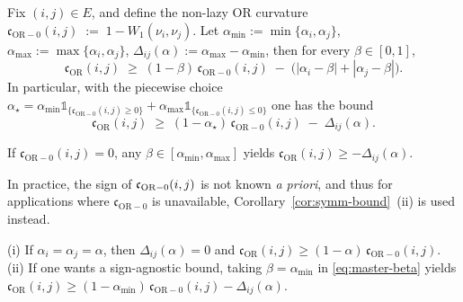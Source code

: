 \documentclass[twoside,11pt]{article}
\numberwithin{equation}{section}
\numberwithin{theorem}{section}
\numberwithin{example}{section}
\begin{document}
\begin{proposition}
\label{prop:sharper-transfer}
Fix $(i,j)\in E$, and define the non-lazy OR curvature
\(
\mathfrak c_{\mathrm{OR}-0}(i,j) \;:=\; 1 - W_1(\nu_i,\nu_j).
\)
Let $\alpha_{\min}:=\min\{\alpha_i,\alpha_j\}$, $\alpha_{\max}:=\max\{\alpha_i,\alpha_j\}$, $\Delta_{ij}(\alpha):=\alpha_{\max}-\alpha_{\min}$, then for every $\beta\in[0,1]$,
\begin{equation}
\label{eq:master-beta}
\mathfrak c_{\mathrm{OR}}(i,j)
\;\ge\;
(1-\beta)\,\mathfrak c_{\mathrm{OR}-0}(i,j)\;-\;\bigl(|\alpha_i-\beta|+|\alpha_j-\beta|\bigr).
\end{equation}
In particular, with the piecewise choice
\(\alpha_\star =\alpha_{\min}\mathds 1_{\{\mathfrak c_{\mathrm{OR}\!-\!0}(i,j)\ge 0\}}+\alpha_{\max}\mathds 1_{\{\mathfrak c_{\mathrm{OR}\!-\!0}(i,j)\le 0\}}
\)
one has the bound
\begin{equation}
\label{eq:sharper-piecewise}
\mathfrak c_{\mathrm{OR}}(i,j)
\;\ge\;
(1-\alpha_\star)\,\mathfrak c_{\mathrm{OR}-0}(i,j)\;-\;\Delta_{ij}(\alpha).
\end{equation}
\end{proposition}

\begin{remark}
If $\mathfrak c_{\mathrm{OR}-0}(i,j)=0$, any $\beta\in[\alpha_{\min},\alpha_{\max}]$ yields $\mathfrak c_{\mathrm{OR}}(i,j)\ge-\Delta_{ij}(\alpha)$.
\end{remark}

In practice, the sign of $\mathfrak c_{\rm OR-0}(i,j)$ is not known \emph{a priori}, and thus for applications where $\mathfrak c_{\mathrm{OR}-0}$ is unavailable, Corollary~\ref{cor:symm-bound}~{\rm(ii)} is used instead. 

\begin{corollary}
\label{cor:symm-bound} 
{\rm (i)} If $\alpha_i=\alpha_j=\alpha$, then $\Delta_{ij}(\alpha)=0$ and
\(\mathfrak c_{\mathrm{OR}}(i,j)\ge (1-\alpha)\,\mathfrak c_{\mathrm{OR}\!-\!0}(i,j).
\)
{\rm (ii)} If one wants a sign-agnostic bound, taking $\beta=\alpha_{\min}$ in \eqref{eq:master-beta} yields
\(
\mathfrak c_{\mathrm{OR}}(i,j)\ge (1-\alpha_{\min})\,\mathfrak c_{\mathrm{OR}\!-\!0}(i,j)-\Delta_{ij}(\alpha).
\)
\end{corollary}
\end{document}
